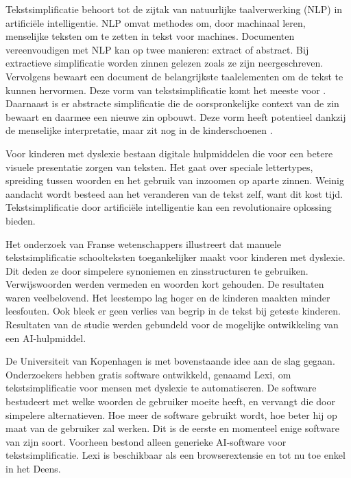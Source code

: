 Tekstsimplificatie behoort tot de zijtak van natuurlijke taalverwerking (NLP) in artificiële intelligentie. NLP omvat methodes om, door machinaal leren, menselijke teksten om te zetten in tekst voor machines. Documenten vereenvoudigen met NLP kan op twee manieren: extract of abstract. Bij extractieve simplificatie worden zinnen gelezen zoals ze zijn neergeschreven. Vervolgens bewaart een document de belangrijkste taalelementen om de tekst te kunnen hervormen. Deze vorm van tekstsimplificatie komt het meeste voor \autocite{Sciforce2020}. Daarnaast is er abstracte simplificatie die de oorspronkelijke context van de zin bewaart en daarmee een nieuwe zin opbouwt. Deze vorm heeft potentieel dankzij de menselijke interpretatie, maar zit nog in de kinderschoenen \autocite{Chowdhary2020}.







Voor kinderen met dyslexie bestaan digitale hulpmiddelen die voor een betere visuele presentatie zorgen van teksten. Het gaat over speciale lettertypes, spreiding tussen woorden en het gebruik van inzoomen op aparte zinnen. Weinig aandacht wordt besteed aan het veranderen van de tekst zelf, want dit kost tijd. Tekstsimplificatie door artificiële intelligentie kan een revolutionaire oplossing bieden. 

Het onderzoek van Franse wetenschappers \textcite{Gala2016} illustreert dat manuele tekstsimplificatie schoolteksten toegankelijker maakt voor kinderen met dyslexie. Dit deden ze door simpelere synoniemen en zinsstructuren te gebruiken. Verwijswoorden werden vermeden en woorden kort gehouden. De resultaten waren veelbelovend. Het leestempo lag hoger en de kinderen maakten minder leesfouten. Ook bleek er geen verlies van begrip in de tekst bij geteste kinderen. Resultaten van de studie werden gebundeld voor de mogelijke ontwikkeling van een AI-hulpmiddel.

De Universiteit van Kopenhagen is met bovenstaande idee aan de slag gegaan. Onderzoekers \textcite{Bingel2018} hebben gratis software ontwikkeld, genaamd Lexi, om tekstsimplificatie voor mensen met dyslexie te automatiseren. De software bestudeert met welke woorden de gebruiker moeite heeft, en vervangt die door simpelere alternatieven. Hoe meer de software gebruikt wordt, hoe beter hij op maat van de gebruiker zal werken. Dit is de eerste en momenteel enige software van zijn soort. Voorheen bestond alleen generieke AI-software voor tekstsimplificatie. Lexi is beschikbaar als een browserextensie en tot nu toe enkel in het Deens. 

